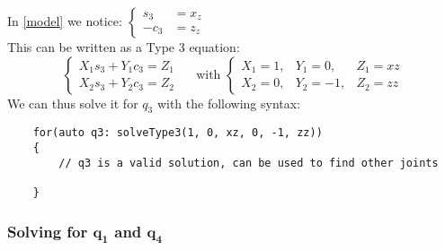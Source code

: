 \documentclass{ecnreport}
\begin{document}
In \eqref{model} we notice: $\left\{\begin{array}{ll}s_3 &= x_z \\ -c_3 &= z_z\end{array}\right.$  \\
This can be written as a Type 3 equation:
\begin{equation*}
\left\{\begin{array}{l}X_1s_3+Y_1c_3 = Z_1 \\ X_2s_3+Y_2c_3 = Z_2\end{array}\right. \quad \text{ with } 
\left\{\begin{array}{ccc}
        X_1 = 1, & Y_1 = 0, & Z_1 = xz \\X_2 = 0, & Y_2 = -1, & Z_2 = zz
        \end{array}\right.
        \label{eq:q3}
\end{equation*} 
We can thus solve it for $q_3$ with the following syntax:
\begin{center}
    \cppstyle \raggedright
    \begin{lstlisting}
    for(auto q3: solveType3(1, 0, xz, 0, -1, zz))
    {
        // q3 is a valid solution, can be used to find other joints        
    
    }
    \end{lstlisting}
\end{center}

    \subsubsection*{Solving for $\mathbf{q_1}$ and $\mathbf{q_4}$}
    
\end{document}
